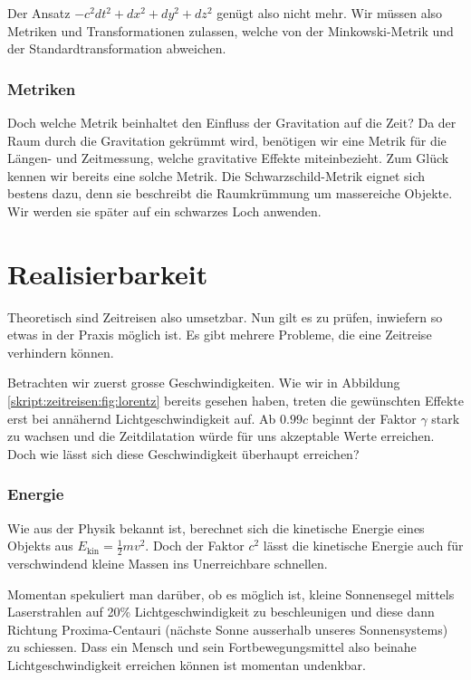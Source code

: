 \begin{refsection}
	Der Ansatz $ -c^2dt^2 + dx^2 + dy^2 + dz^2$ genügt also nicht mehr. Wir müssen also Metriken und Transformationen zulassen, welche von der Minkowski-Metrik und der Standardtransformation abweichen.
	
	\subsubsection{Metriken}\label{skript:chapter:zeitreisen:metriken}
	Doch welche Metrik beinhaltet den Einfluss der Gravitation auf die Zeit? 
	Da der Raum durch die Gravitation gekrümmt wird, benötigen wir eine Metrik für die Längen- und Zeitmessung, welche gravitative Effekte miteinbezieht.
	Zum Glück kennen wir bereits eine solche Metrik. Die Schwarz\-schild-Metrik eignet sich bestens dazu, denn sie beschreibt die Raumkrümmung um massereiche Objekte. Wir werden sie später auf ein schwarzes Loch anwenden. 
%

	\section{Realisierbarkeit}
    Theoretisch sind Zeitreisen also umsetzbar. Nun gilt es zu prüfen, inwiefern so etwas in der Praxis möglich ist. Es gibt mehrere Probleme, die eine Zeitreise verhindern können.
    
    Betrachten wir zuerst grosse Geschwindigkeiten. Wie wir in Abbildung \ref{skript:zeitreisen:fig:lorentz} bereits gesehen haben, treten die gewünschten Effekte erst bei annähernd Lichtgeschwindigkeit auf. Ab $0.99c$ beginnt der Faktor $\gamma$ stark zu wachsen und die Zeitdilatation würde für uns akzeptable Werte erreichen.
    Doch wie lässt sich diese Geschwindigkeit überhaupt erreichen?
    
    \subsubsection{Energie}\label{skript:chapters:zrirtreisen:energie}
    Wie aus der Physik bekannt ist, berechnet sich die kinetische Energie eines Objekts aus $E_{\text{kin}}=\frac{1}{2}mv^2$. Doch der Faktor $c^2$ lässt die kinetische Energie auch für verschwindend kleine Massen ins Unerreichbare schnellen.
    
    Momentan spekuliert man darüber, ob es möglich ist, kleine Sonnensegel mittels Laserstrahlen auf 20\% Lichtgeschwindigkeit zu beschleunigen und diese dann Richtung Proxima-Centauri (nächste Sonne ausserhalb unseres Sonnensystems) zu schiessen. Dass ein Mensch und sein Fortbewegungsmittel also beinahe Lichtgeschwindigkeit erreichen können ist momentan undenkbar.
    

\end{refsection}
